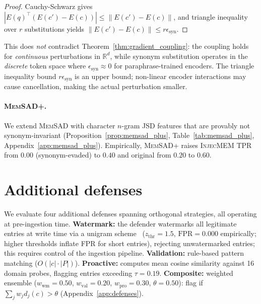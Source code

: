 \documentclass{article}
\theoremstyle{definition}
\newcommand{\fpr}{\text{FPR}}
\newcommand{\RR}{\mathbb{R}}
\newcommand{\memsad}{\textnormal{\textsc{MemSAD}}}
\newcommand{\injecmem}{\textsc{InjecMEM}}
\newcommand{\enc}{E}
\begin{document}
\begin{proof}
Cauchy-Schwarz gives $|\enc(q)^\top(\enc(c') - \enc(c))| \leq \|\enc(c') - \enc(c)\|$, and triangle inequality over $r$ substitutions yields $\|\enc(c') - \enc(c)\| \leq r\epsilon_{\text{syn}}$.
\end{proof}

This does \emph{not} contradict Theorem~\ref{thm:gradient_coupling}: the coupling holds for \emph{continuous} perturbations in $\RR^d$, while synonym substitution operates in the \emph{discrete} token space where $\epsilon_{\text{syn}} \approx 0$ for paraphrase-trained encoders. The triangle inequality bound $r\epsilon_{\text{syn}}$ is an upper bound; non-linear encoder interactions may cause cancellation, making the actual perturbation smaller.

\paragraph{\memsad{}+.} We extend \memsad{} with character $n$-gram JSD features that are provably not synonym-invariant (Proposition~\ref{prop:memsad_plus}, Table~\ref{tab:memsad_plus}, Appendix~\ref{app:memsad_plus}). Empirically, \memsad{}+ raises \injecmem{} TPR from $0.00$ (synonym-evaded) to $0.40$ and original from $0.20$ to $0.60$.

\section{Additional defenses}
\label{sec:other_defenses}

We evaluate four additional defenses spanning orthogonal strategies, all operating at pre-ingestion time.
\textbf{Watermark:} the defender watermarks all legitimate entries at write time via a unigram scheme~\citep{zhao2024watermark,kirchenbauer2023watermark} ($z_{\text{thr}} = 1.5$, $\fpr = 0.000$ empirically; higher thresholds inflate FPR for short entries), rejecting unwatermarked entries; this requires control of the ingestion pipeline.
\textbf{Validation:} rule-based pattern matching ($O(|c| \cdot |P|)$).
\textbf{Proactive:} computes mean cosine similarity against 16 domain probes, flagging entries exceeding $\tau = 0.19$.
\textbf{Composite:} weighted ensemble ($w_{\text{wm}}{=}0.50$, $w_{\text{val}}{=}0.20$, $w_{\text{pro}}{=}0.30$, $\theta{=}0.50$): flag if $\sum_j w_j d_j(c) > \theta$ (Appendix~\ref{app:defenses}).

\end{document}
